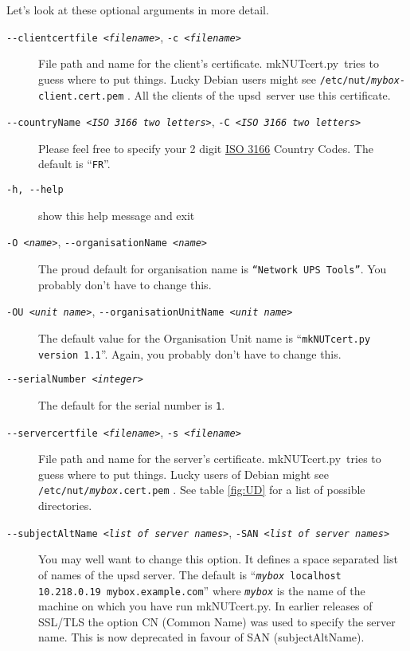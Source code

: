\documentclass[12pt]{article}
\newcommand{\upsd}{\mbox{\textcolor{UPSDCOLOUR}{upsd}}}
\newcommand{\mkNUTcert}{\mbox{\textcolor{MKNUTCERTCOLOUR}{mkNUTcert.py}}}
\newcommand{\ISOpays}{\href{https://www.iso.org/obp/ui\#search}%
                           {ISO 3166} Country Codes}
\begin{document}
Let's look at these optional arguments in more detail.  

\begin{description}
\item[\texttt{-\/-clientcertfile \textit{<filename>}},
      \texttt{-c \textit{<filename>}}]
  File path and name for the client's certificate.  \mkNUTcert\ tries
  to guess where to put things.  Lucky Debian users might see
  \texttt{/etc/nut/{\allowbreak}\textit{mybox}-client.cert.pem}
  .  All the clients of the \upsd\ server use this certificate.

\item[\texttt{-\/-countryName \textit{<ISO 3166 two letters>}},
      \texttt{-C \textit{<ISO 3166 two letters>}}]
  \hfill Please feel free to specify your 2 digit \ISOpays.
  The default is ``\texttt{FR}''.

\item[\texttt{-h, -\/-help}] show this help message and exit

\item[\texttt{-O \textit{<name>}},
      \texttt{-\/-organisationName \textit{<name>}}]
  The proud default for organisation name is \texttt{``Network UPS
    Tools''}.  You probably don't have to change this.

\item[\texttt{-OU \textit{<unit name>}},
      \texttt{-\/-organisationUnitName \textit{<unit name>}}]
  The default value for the Organisation Unit
  name is ``\texttt{mkNUTcert.py version 1.1}''.  Again, you probably
  don't have to change this.

\item[\texttt{-\/-serialNumber \textit{<integer>}}] The default for
  the serial number is \texttt{1}.

\item[\texttt{-\/-servercertfile    \textit{<filename>}},
      \texttt{-s \textit{<filename>}}]
  File path and name for the server's
  certificate.  \mkNUTcert\ tries to guess where to put things.  Lucky
  users of Debian might see
  \texttt{/etc/nut/{\allowbreak}\textit{mybox}.cert.pem}
  .  See table \ref{fig:UD} for a list of possible directories.

\item[\texttt{-\/-subjectAltName \textit{<list of server names>}},
      \texttt{-SAN \textit{<list of server names>}}]
  \hfill You may well want to change this option.
  It defines a space separated list of names of the upsd server.  The
  default is ``\texttt{\textit{mybox} localhost 10.218.0.19
    mybox.example.com}'' where \texttt{\textit{mybox}} is the name of
  the machine on which you have run \mkNUTcert.  In earlier releases
  of SSL/TLS the option CN (Common Name) was used to specify the
  server name.  This is now deprecated in favour of SAN
  (subjectAltName).


\end{description}
\end{document}
